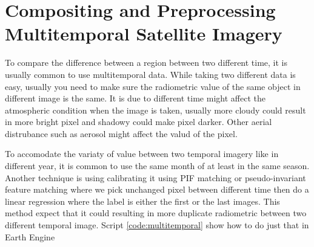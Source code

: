 \section{Compositing and Preprocessing Multitemporal Satellite Imagery}
To compare the difference between a region between two different time, it is usually common to use multitemporal data. While taking two different data is easy, usually you need to make sure the radiometric value of the same object in different image is the same. It is due to different time might affect the atmospheric condition when the image is taken, usually more cloudy could result in more bright pixel and shadowy could make pixel darker. Other aerial distrubance such as aerosol might affect the valud of the pixel.

To accomodate the variaty of value between two temporal imagery like in different year, it is common to use the same month of at least in the same season. Another technique is using calibrating it using PIF matching or pseudo-invariant feature matching where we pick unchanged pixel between different time then do a linear regression where the label is either the first or the last images. This method expect that it could resulting in more duplicate radiometric between two different temporal image. Script \ref{code:multitemporal} show how to do just that in Earth Engine

